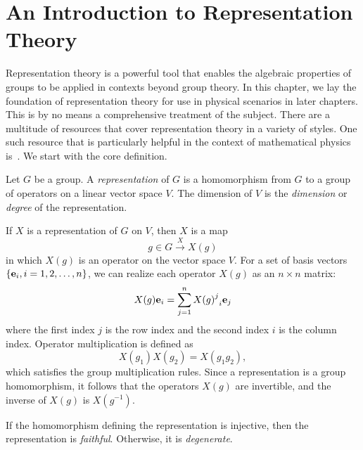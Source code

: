 \chapter{An Introduction to Representation Theory}\label{ch:rep_background}

Representation theory is a powerful tool that enables the algebraic properties of groups to be applied in contexts beyond group theory. In this chapter, we lay the foundation of representation theory for use in physical scenarios in later chapters. This is by no means a comprehensive treatment of the subject. There are a multitude of resources that cover representation theory in a variety of styles. One such resource that is particularly helpful in the context of mathematical physics is~\cite{Tung1985}. We start with the core definition.
\begin{definition}
    Let $G$ be a group. A \textit{representation} of $G$ is a homomorphism from $G$ to a group of operators on a linear vector space $V$. The dimension of $V$ is the \textit{dimension} or \textit{degree} of the representation.
\end{definition}

If $X$ is a representation of $G$ on $V$, then $X$ is a map
\begin{equation}
    g\in G\xrightarrow{X} X(g)
\end{equation}
in which $X(g)$ is an operator on the vector space $V$. For a set of basis vectors $\{\mathbf{e}_i,i=1,2,\dots,n\}$, we can realize each operator $X(g)$ as an $n\times n$ matrix:
\begin{equation}
    X(g)\e_i = \sum_{j=1}^n {{X(g)}^j}_i\e_j %
\end{equation}
where the first index $j$ is the row index and the second index $i$ is the column index. Operator multiplication is defined as
\begin{equation}
    X(g_1)X(g_2) = X(g_1g_2),
\end{equation}
which satisfies the group multiplication rules. Since a representation is a group homomorphism, it follows that the operators $X(g)$ are invertible, and the inverse of $X(g)$ is $X(g^{-1})$.

\begin{definition}
    If the homomorphism defining the representation is injective, then the representation is \textit{faithful}. Otherwise, it is \textit{degenerate}.
\end{definition}

